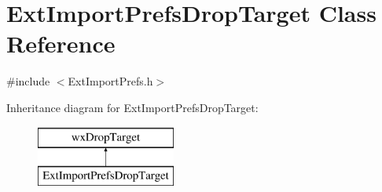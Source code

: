 \hypertarget{class_ext_import_prefs_drop_target}{}\section{Ext\+Import\+Prefs\+Drop\+Target Class Reference}
\label{class_ext_import_prefs_drop_target}


{\ttfamily \#include $<$Ext\+Import\+Prefs.\+h$>$}

Inheritance diagram for Ext\+Import\+Prefs\+Drop\+Target\+:\begin{figure}[H]
\begin{center}
\leavevmode
\includegraphics[height=2.000000cm]{class_ext_import_prefs_drop_target}
\end{center}
\end{figure}
